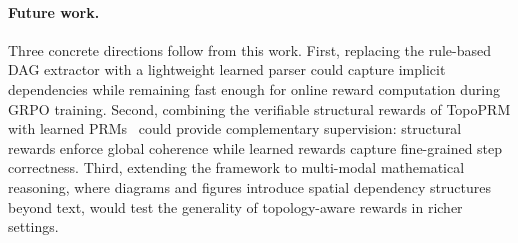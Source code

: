 \paragraph{Future work.}
Three concrete directions follow from this work. First, replacing the
rule-based DAG extractor with a lightweight learned parser could capture
implicit dependencies while remaining fast enough for online reward
computation during GRPO training. Second, combining the verifiable
structural rewards of TopoPRM with learned
PRMs~\citep{lightman2023lets} could provide complementary supervision:
structural rewards enforce global coherence while learned rewards capture
fine-grained step correctness. Third, extending the framework to
multi-modal mathematical reasoning, where diagrams and figures introduce
spatial dependency structures beyond text, would test the generality of
topology-aware rewards in richer settings.
